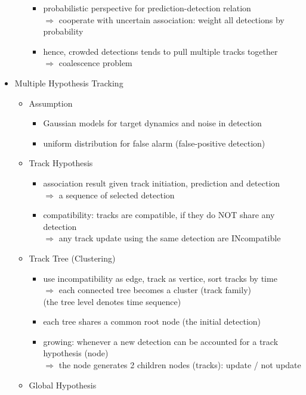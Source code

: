 \begin{itemize}
\begin{itemize}
\begin{itemize}
		\item probabilistic perspective for prediction-detection relation \\ 
		$\Rightarrow$ cooperate with uncertain association: weight all detections by probability
		\item hence, crowded detections tends to pull multiple tracks together \\ 
		$\Rightarrow$ coalescence problem
		\end{itemize}
	\end{itemize}
\item Multiple Hypothesis Tracking
	\begin{itemize}
	\item Assumption
		\begin{itemize}
		\item Gaussian models for target dynamics and noise in detection
		\item uniform distribution for false alarm (false-positive detection)
		\end{itemize}
	\item Track Hypothesis
		\begin{itemize}
		\item association result given track initiation, prediction and detection \\
		$\Rightarrow$ a sequence of selected detection
		\item compatibility: tracks are compatible, if they do NOT share any detection \\
		$\Rightarrow$ any track update using the same detection are INcompatible
		\end{itemize}
	\item Track Tree (Clustering)
		\begin{itemize}
		\item use incompatibility as edge, track as vertice, sort tracks by time \\
		$\Rightarrow$ each connected tree becomes a cluster (track family) \\
		(the tree level denotes time sequence)
		\item each tree shares a common root node (the initial detection)
		\item growing: whenever a new detection can be accounted for a track hypothesis (node)  \\ 
		$\Rightarrow$ the node generates 2 children nodes (tracks): update / not update
		\end{itemize}
	\item Global Hypothesis

\end{itemize}
\end{itemize}
